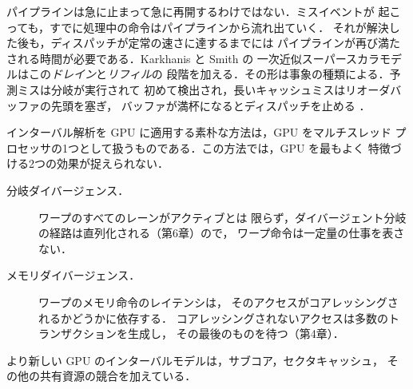 \documentclass[../main.tex]{subfiles}
\begin{document}
パイプラインは急に止まって急に再開するわけではない．ミスイベントが
起こっても，すでに処理中の命令はパイプラインから流れ出ていく．
それが解決した後も，ディスパッチが定常の速さに達するまでには
パイプラインが再び満たされる時間が必要である．Karkhanis と Smith の
一次近似スーパースカラモデルはこの\emph{ドレイン}と\emph{リフィル}の
段階を加える．その形は事象の種類による．予測ミスは分岐が実行されて
初めて検出され，長いキャッシュミスはリオーダバッファの先頭を塞ぎ，
バッファが満杯になるとディスパッチを止める
\cite{karkhanis2004firstorder}．

インターバル解析を GPU に適用する素朴な方法は，GPU をマルチスレッド
プロセッサの1つとして扱うものである．この方法では，GPU を最もよく
特徴づける2つの効果が捉えられない．
\begin{description}
  \item[分岐ダイバージェンス．]  ワープのすべてのレーンがアクティブとは
    限らず，ダイバージェント分岐の経路は直列化される（第6章）ので，
    ワープ命令は一定量の仕事を表さない．
  \item[メモリダイバージェンス．]  ワープのメモリ命令のレイテンシは，
    そのアクセスがコアレッシングされるかどうかに依存する．
    コアレッシングされないアクセスは多数のトランザクションを生成し，
    その最後のものを待つ（第4章）．
\end{description}
%
より新しい GPU のインターバルモデルは，サブコア，セクタキャッシュ，
その他の共有資源の競合を加えている．
\end{document}
